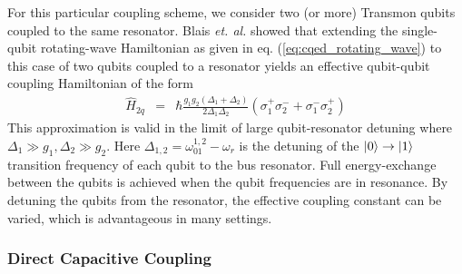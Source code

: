 For this particular coupling scheme, we consider two (or more) Transmon qubits coupled to the same resonator. Blais {\it et. al.} \citep{blais_quantum-information_2007} showed that extending the single-qubit rotating-wave Hamiltonian as given in eq. (\ref{eq:cqed_rotating_wave}) to this case of two qubits coupled to a resonator yields an effective qubit-qubit coupling Hamiltonian of the form
%
\begin{eqnarray}
\hat{H}_{2q} & = & \hbar\frac{g_1 g_2(\Delta_1+\Delta_2)}{2\Delta_1\Delta_2}(\sigma_1^+\sigma_2^-+\sigma_1^-\sigma_2^+) \label{eq:cqed_bus_coupling}
\end{eqnarray}
%
This approximation is valid in the limit of large qubit-resonator detuning where $\Delta_1 \gg g_1,\Delta_2 \gg g_2$. Here $\Delta_{1,2} = \omega_{01}^{1,2}-\omega_r$ is the detuning of the $\left| 0 \right>\to\left| 1 \right>$ transition frequency of each qubit to the bus resonator. Full energy-exchange between the qubits is achieved when the qubit frequencies are in resonance. By detuning the qubits from the resonator, the effective coupling constant can be varied, which is advantageous in many settings. 

\subsubsection{Direct Capacitive Coupling}

